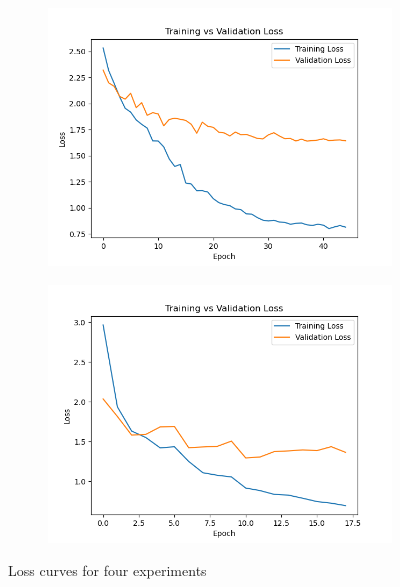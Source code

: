 \documentclass{article}
\begin{document}
\begin{figure}[H]
      \begin{subfigure}[b]{0.45\textwidth}
        \centering
        \includegraphics[width=\textwidth]{figures/loss_curve_3.png}
        \caption{}
        \label{fig:loss_curve_3}
      \end{subfigure}
      \hfill
      \begin{subfigure}[b]{0.45\textwidth}
        \centering
        \includegraphics[width=\textwidth]{figures/loss_curve_4.png}
        \caption{}
        \label{fig:loss_curve_4}
      \end{subfigure}
    
      \caption{Loss curves for four experiments}
      \label{fig:loss_curve}
    \end{figure}
\end{document}
